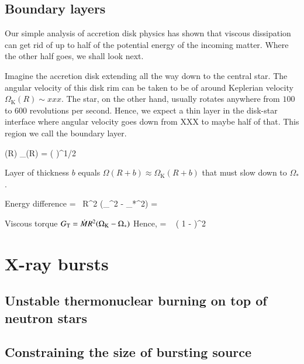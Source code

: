 \subsection{Boundary layers}

Our simple analysis of accretion disk physics has shown that viscous dissipation can get rid of up to half of the potential energy of the incoming matter.
Where the other half goes, we shall look next.

Imagine the accretion disk extending all the way down to the central star.
The angular velocity of this disk rim can be taken to be of around Keplerian velocity $\Omega_{\mathrm{K}}(R) \sim xxx$.
The star, on the other hand, usually rotates anywhere from $100$ to $600$ revolutions per second.
Hence, we expect a thin layer in the disk-star interface where angular velocity goes down from XXX to maybe half of that.
This region we call the boundary layer.


\be
\Omega(R) \approx \Omega_{}(R) = \left(  \right)^{1/2}
\ee

Layer of thickness $b$ equals $\Omega(R + b) \approx \Omega_{\mathrm{K}}(R + b)$ that must slow down to $\Omega_{*}$.

Energy difference
\be
{} =  \Mdot R^2 (\Omega_{}^2 - \Omega_{*}^2) = 
 \Mdot {}  
\ee

Viscous torque $G_{\mathrm{T}} = \dot{M} R^2 (\Omega_{\mathrm{K}} - \Omega_*)$
Hence,
\be
{} =   \left( 1 -  \right)^2
\ee


\section{X-ray bursts}
\subsection{Unstable thermonuclear burning on top of neutron stars}

\subsection{Constraining the size of bursting source}




